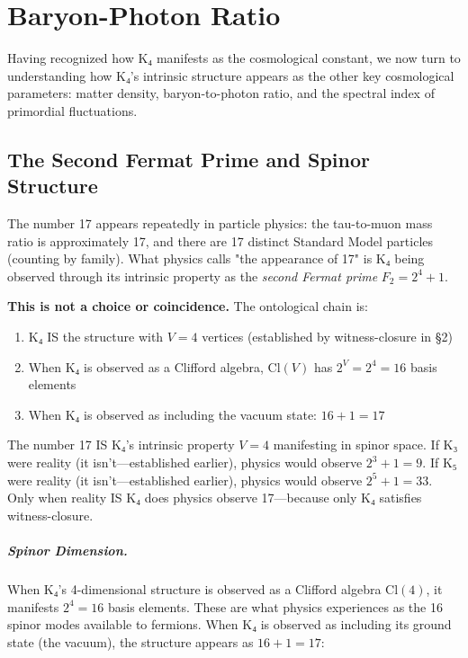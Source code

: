 \documentclass[11pt,a4paper]{book}
\begin{document}

\chapter{Baryon-Photon Ratio}
\label{chap:matter-density}

Having recognized how K₄ manifests as the cosmological constant, we now turn to understanding how K₄'s intrinsic structure appears as the other key cosmological parameters: matter density, baryon-to-photon ratio, and the spectral index of primordial fluctuations.

\section{The Second Fermat Prime and Spinor Structure}

The number 17 appears repeatedly in particle physics: the tau-to-muon mass ratio is 
approximately 17, and there are 17 distinct Standard Model particles (counting by family). 
What physics calls "the appearance of 17" is K₄ being observed through its intrinsic property as the \emph{second Fermat prime} $F_2 = 2^4 + 1$.

\textbf{This is not a choice or coincidence.} The ontological chain is:
\begin{enumerate}
\item K₄ IS the structure with $V = 4$ vertices (established by witness-closure in \S 2)
\item When K₄ is observed as a Clifford algebra, $\text{Cl}(V)$ has $2^V = 2^4 = 16$ basis elements
\item When K₄ is observed as including the vacuum state: $16 + 1 = 17$
\end{enumerate}

The number 17 IS K₄'s intrinsic property $V = 4$ manifesting in spinor space. 
If K₃ were reality (it isn't—established earlier), physics would observe $2^3 + 1 = 9$.
If K₅ were reality (it isn't—established earlier), physics would observe $2^5 + 1 = 33$.
Only when reality IS K₄ does physics observe 17—because only K₄ satisfies witness-closure.

\paragraph{Spinor Dimension.}
When K₄'s 4-dimensional structure is observed as a Clifford algebra $\text{Cl}(4)$, it manifests 
$2^4 = 16$ basis elements. These are what physics experiences as the 16 spinor modes available 
to fermions. When K₄ is observed as including its ground state (the vacuum), the structure 
appears as $16 + 1 = 17$:
\end{document}
